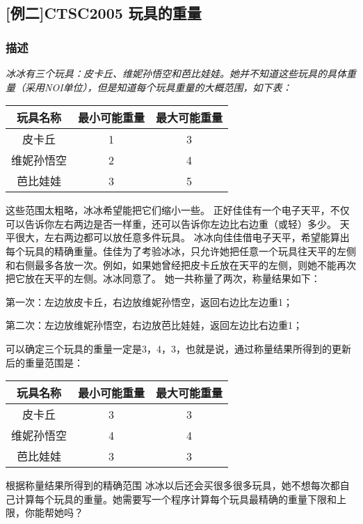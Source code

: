 \subsection{[例二]CTSC2005 玩具的重量}
\subsubsection{描述}
{\itshape 
	冰冰有三个玩具：皮卡丘、维妮孙悟空和芭比娃娃。她并不知道这些玩具的具体重量（采用NOI单位），但是知道每个玩具重量的大概范围，如下表：

		\begin{center}
		\begin{tabular}{|c|c|c|}
	\hline
	玩具名称 & 最小可能重量 & 最大可能重量 \\ \hline
	皮卡丘 & 1 & 3 \\ \hline
	维妮孙悟空 & 2 & 4 \\ \hline
	芭比娃娃 & 3 & 5 \\ \hline
	\end{tabular}
	\end{center}
\par 这些范围太粗略，冰冰希望能把它们缩小一些。 正好佳佳有一个电子天平，不仅可以告诉你左右两边是否一样重，还可以告诉你左边比右边重（或轻）多少。
天平很大，左右两边都可以放任意多件玩具。 冰冰向佳佳借电子天平，希望能算出每个玩具的精确重量。佳佳为了考验冰冰，只允许她把任意一个玩具往天平的左侧和右侧最多各放一次。例如，如果她曾经把皮卡丘放在天平的左侧，则她不能再次把它放在天平的左侧。冰冰同意了。
她一共称量了两次，称量结果如下：
\par 第一次：左边放皮卡丘，右边放维妮孙悟空，返回右边比左边重1；
\par 第二次：左边放维妮孙悟空，右边放芭比娃娃，返回左边比右边重1；
\par 可以确定三个玩具的重量一定是3，4，3，也就是说，通过称量结果所得到的更新后的重量范围是：
		\begin{center}
		\begin{tabular}{|c|c|c|}
	\hline
	玩具名称 & 最小可能重量 & 最大可能重量 \\ \hline
	皮卡丘 & 3 & 3 \\ \hline
	维妮孙悟空 & 4 & 4 \\ \hline
	芭比娃娃 & 3 & 3 \\ \hline
	\end{tabular}
	\end{center}

根据称量结果所得到的精确范围 冰冰以后还会买很多很多玩具，她不想每次都自己计算每个玩具的重量。她需要写一个程序计算每个玩具最精确的重量下限和上限，你能帮她吗？
}
